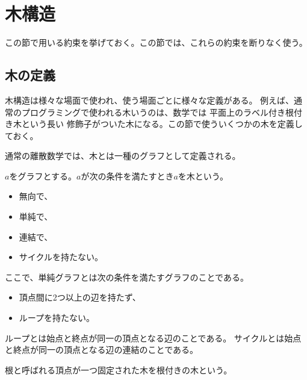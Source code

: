\section{木構造}\label{s1:木構造} %
	この節で用いる約束を挙げておく。この節では、これらの約束を断りなく使う。
	

	\subsection{木の定義}\label{s2:木の定義} %
		木構造は様々な場面で使われ、使う場面ごとに様々な定義がある。
		例えば、通常のプログラミングで使われる木いうのは、数学では
		平面上のラベル付き根付き木\cite{arxiv:hoffman:0710.3739}という長い
		修飾子がついた木になる。この節で使ういくつかの木を定義しておく。

		通常の離散数学では、木とは一種のグラフとして定義される。

		\begin{definition}[木]\label{def:木} %
			$a$をグラフとする。$a$が次の条件を満たすとき$a$を木という。
			\begin{itemize}\setlength{\itemsep}{-1mm} %
				\item 無向で、
				\item 単純で、
				\item 連結で、
				\item サイクルを持たない。
			\end{itemize} %
			ここで、単純グラフとは次の条件を満たすグラフのことである。
			\begin{itemize}\setlength{\itemsep}{-1mm} %
				\item 頂点間に2つ以上の辺を持たず、
				\item ループを持たない。
			\end{itemize} %
			ループとは始点と終点が同一の頂点となる辺のことである。
			サイクルとは始点と終点が同一の頂点となる辺の連結のことである。
		\end{definition} %

		\begin{definition}[根付きの木]\label{def:根付きの木} %
			根と呼ばれる頂点が一つ固定された木を根付きの木という。
		\end{definition} %

